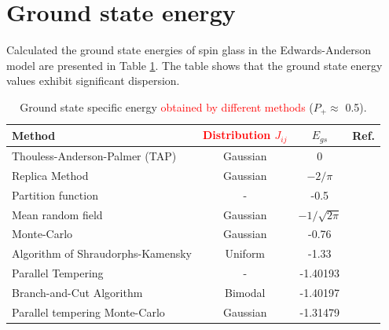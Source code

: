\documentclass[preprint,12pt]{elsarticle}
\begin{document}
	\section{Ground state energy}
	
	Calculated the ground state energies of spin glass in the Edwards-Anderson model are presented in Table \ref{tab:Egs}. The table shows that the ground state energy values exhibit significant dispersion.
	
	\begin{table}[h]
		\begin{tabular}{|l|c|c|l|}
			\hline
			Method     &     \textcolor{red}{Distribution $J_{ij}$}                         &
			$E_{gs}$                                       &  Ref.                                          \\ \hline
			Thouless-Anderson-Palmer (TAP)& Gaussian &  0                                              & \cite{thouless1977solution}    \\ \hline
			Replica Method   & Gaussian                         & $-2/\pi$                                       & \cite{sherrington1975solvable} \\ \hline
			Partition function   &   -                 & -0.5                                           & \cite{tanaka1980analytic}      \\ \hline
			Mean random field  &   Gaussian  &                   $-1/\sqrt{2\pi}$                               & \cite{klein1976comparison}     \\ \hline
			Monte-Carlo      &   Gaussian    &        -0.76                                          & \cite{kirkpatrick1978infinite} \\ \hline
			Algorithm of Shraudorphs-Kamensky   &  Uniform &     -1.33                                          & \cite{karandashev2019global}   \\ \hline
			Parallel Tempering &   -       & -1.40193                                       & \cite{palmer1999ground}        \\ \hline
			Branch-and-Cut Algorithm  & Bimodal               & -1.40197                         
			& \cite{campbell2004energy}      \\ \hline
			
			Parallel tempering Monte-Carlo    &  Gaussian         & -1.31479                                       & \cite{roma2009ground}          \\ \hline
			
			
			
		\end{tabular}
		\caption{Ground state specific energy \textcolor{red}{obtained by different methods} ($P_+\approx$ 0.5).}
		\label{tab:Egs}
	\end{table}
	
\end{document}
